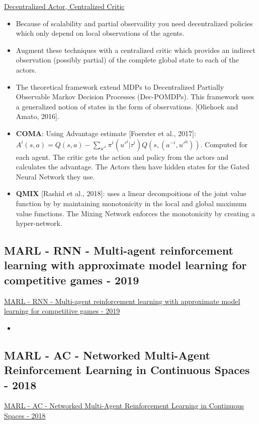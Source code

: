 \underline{Decentralized Actor, Centralized Critic}
\begin{itemize}[noitemsep,nolistsep]
	\item Because of scalability and partial observaility you need decentralized policies which only depend on local observations of the agents.
	\item Augment these techniques with a centralized critic which provides an indirect observation (possibly partial) of the complete global state to each of the actors. 
	\item The theoretical framework extend MDPs to Decentralized Partially Observable Markov Decision Processes (Dec-POMDPs). This framework uses a generalized notion of states in the form of observations. [Oliehoek and Amato, 2016].
	\item \textbf{COMA}: Using Advantage estimate [Foerster et al., 2017]: $A^i(s,a) = Q(s,a) - \sum_{u'^i} \pi^i (u'^i | \tau^i) Q(s,(a^{-i}, u'^a))$. Computed for each agent. The critic gets the action and policy from the actors and calculates the advantage. The Actors then have hidden states for the Gated Neural Network they use.
	\item \textbf{QMIX} [Rashid et al., 2018]: uses a linear decompoitions of the joint value function by by maintaining monotonicity in the local and global maximum value functions. The Mixing Network enforces the monotonicity by creating a hyper-network.
\end{itemize}

\subsection{MARL - RNN - Multi-agent reinforcement learning with approximate model learning for competitive games - 2019}
\href{https://journals.plos.org/plosone/article?id=10.1371/journal.pone.0222215}{MARL - RNN - Multi-agent reinforcement learning with approximate model learning for competitive games - 2019}
\begin{itemize}[noitemsep,nolistsep]
	\item 
\end{itemize}

\subsection{MARL - AC - Networked Multi-Agent Reinforcement Learning in Continuous Spaces - 2018}
\href{https://ieeexplore.ieee.org/abstract/document/8619581}{MARL - AC - Networked Multi-Agent Reinforcement Learning in Continuous Spaces - 2018}

